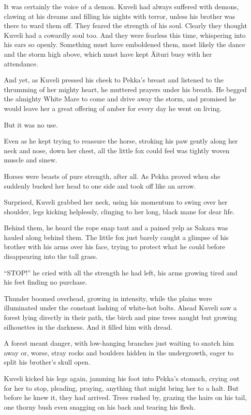 It was certainly the voice of a demon. Kuveli had always suffered with demons, clawing at his dreams and filling his nights with terror, unless his brother was there to ward them off. They feared the strength of his soul. Clearly they thought Kuveli had a cowardly soul too. And they were fearless this time, whispering into his ears so openly. Something must have emboldened them, most likely the dance and the storm high above, which must have kept Äituri busy with her attendance.

And yet, as Kuveli pressed his cheek to Pekka's breast and listened to the thrumming of her mighty heart, he muttered prayers under his breath. He begged the almighty White Mare to come and drive away the storm, and promised he would leave her a great offering of amber for every day he went on living.

But it was no use.

Even as he kept trying to reassure the horse, stroking his paw gently along her neck and nose, down her chest, all the little fox could feel was tightly woven muscle and sinew.

Horses were beasts of pure strength, after all. As Pekka proved when she suddenly bucked her head to one side and took off like an arrow.

Surprised, Kuveli grabbed her neck, using his momentum to swing over her shoulder, legs kicking helplessly, clinging to her long, black mane for dear life.

Behind them, he heard the rope snap taut and a pained yelp as Sakara was hauled along behind them. The little fox just barely caught a glimpse of his brother with his arms over his face, trying to protect what he could before disappearing into the tall grass.

``STOP!'' he cried with all the strength he had left, his arms growing tired and his feet finding no purchase.

Thunder boomed overhead, growing in intensity, while the plains were illuminated under the constant lashing of white-hot bolts. Ahead Kuveli saw a forest lying directly in their path, the birch and pine trees naught but growing silhouettes in the darkness. And it filled him with dread.

A forest meant danger, with low-hanging branches just waiting to snatch him away or, worse, stray rocks and boulders hidden in the undergrowth, eager to split his brother's skull open.

Kuveli kicked his legs again, jamming his foot into Pekka's stomach, crying out for her to stop, pleading, praying, anything that might bring her to a halt. But before he knew it, they had arrived. Trees rushed by, grazing the hairs on his tail, one thorny bush even snagging on his back and tearing his flesh.

